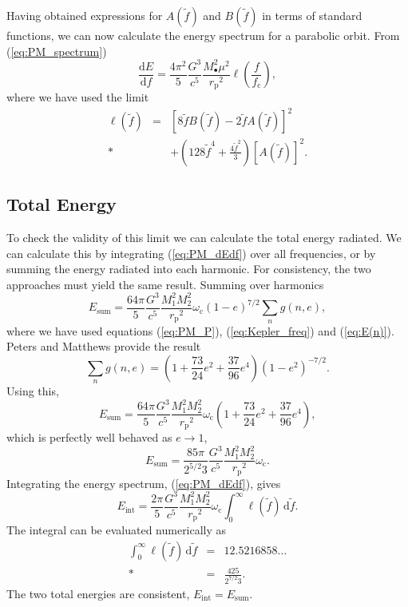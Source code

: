 \documentclass[aps,prd,reprint,showpacs,groupedaddress]{revtex4-1}
\newcommand{\eqnref}[1]{(\ref{eq:#1})}
\newcommand{\sub}[1]{\ensuremath{_\text{#1}}}
\newcommand{\dd}{\ensuremath{\mathrm{d}}}
\newcommand{\diff}[2]{\ensuremath{\frac{\dd {#1}}{\dd {#2}}}}
\newcommand{\intd}[4]{\ensuremath{\int_{#1}^{#2}{#3}\,\dd{#4}}}
\begin{document}
Having obtained expressions for $A(\tilde{f})$ and $B(\tilde{f})$ in terms of standard functions, we can now calculate the energy spectrum for a parabolic orbit. From \eqnref{PM_spectrum}
\begin{equation}
\diff{E}{f} = \frac{4\pi^2}{5}\frac{G^3}{c^5}\frac{M_\bullet^2\mu^2}{r\sub{p}^2}\ell\left(\frac{f}{f\sub{c}}\right),
\label{eq:PM_dEdf}
\end{equation}
where we have used the limit
\begin{eqnarray}
\ell(\tilde{f}) & = & \left[8\tilde{f}B(\tilde{f}) - 2\tilde{f}A(\tilde{f})\right]^2 \nonumber \\*
 & & + \left(128\tilde{f}^4 + \frac{4\tilde{f}^2}{3}\right)\left[A(\tilde{f})\right]^2.
\end{eqnarray}

\subsection{Total Energy}

To check the validity of this limit we can calculate the total energy radiated. We can calculate this by integrating \eqnref{PM_dEdf} over all frequencies, or by summing the energy radiated into each harmonic. For consistency, the two approaches must yield the same result. Summing over harmonics
\begin{equation}
E\sub{sum} = \frac{64\pi}{5}\frac{G^3}{c^5}\frac{M_1^2M_2^2}{r\sub{p}^2}\omega\sub{c}(1-e)^{7/2}\sum_n g(n,e),
\end{equation}
where we have used equations \eqnref{PM_P}, \eqnref{Kepler_freq} and \eqnref{E(n)}. Peters and Matthews\cite{Peters1963} provide the result
\begin{equation}
\sum_n g(n,e) = \left(1 + \frac{73}{24}e^2 + \frac{37}{96}e^4\right)(1-e^2)^{-7/2}.
\end{equation}
Using this,
\begin{equation}
E\sub{sum} = \frac{64\pi}{5}\frac{G^3}{c^5}\frac{M_1^2M_2^2}{r\sub{p}^2}\omega\sub{c}\left(1 + \frac{73}{24}e^2 + \frac{37}{96}e^4\right),
\end{equation}
which is perfectly well behaved as $e \rightarrow 1$,
\begin{equation}
E\sub{sum} = \frac{85\pi}{2^{5/2}3}\frac{G^3}{c^5}\frac{M_1^2M_2^2}{r\sub{p}^2}\omega\sub{c}.
\label{eq:PM_total}
\end{equation}
Integrating the energy spectrum, \eqnref{PM_dEdf}, gives
\begin{equation}
E\sub{int} = \frac{2\pi}{5}\frac{G^3}{c^5}\frac{M_1^2M_2^2}{r\sub{p}^2}\omega\sub{c}\intd{0}{\infty}{\ell(\tilde{f})}{\tilde{f}}.
\end{equation}
The integral can be evaluated numerically as
\begin{eqnarray}
\intd{0}{\infty}{\ell(\tilde{f})}{\tilde{f}} & = & 12.5216858\ldots \nonumber \\*
 & = & \frac{425}{2^{7/2}3}.
\end{eqnarray}
The two total energies are consistent, $E\sub{int} = E\sub{sum}$.
\end{document}
